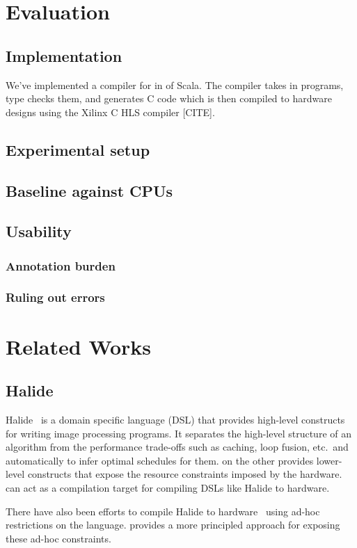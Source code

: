 \documentclass[acmsmall,review,anonymous]{acmart}\settopmatter{printfolios=true,printccs=false,printacmref=false}
\begin{document}
\section{Evaluation}
\subsection{Implementation}
We've implemented a compiler for \sys{} in \sysloc{} of Scala. The compiler
takes in \sys{} programs, type checks them, and generates C code which is then
compiled to hardware designs using the Xilinx C HLS compiler [CITE].
\subsection{Experimental setup}
\subsection{Baseline against CPUs}
\subsection{Usability}
\subsubsection{Annotation burden}
\subsubsection{Ruling out errors}

\section{Related Works}

\subsection{Halide}
Halide~\cite{halide} is a domain specific language (DSL) that provides high-level constructs for writing image processing
programs. It separates the high-level structure of an algorithm from the
performance trade-offs such as caching, loop fusion, etc.\ and automatically to
infer optimal schedules for them. \sys{} on the other provides lower-level constructs
that expose the resource constraints imposed by the hardware. \sys{} can act as a
compilation target for compiling DSLs like Halide to hardware.

There have also been efforts to compile Halide to hardware~\cite{halide-hls} using ad-hoc
restrictions on the language. \sys{} provides a more principled approach for
exposing these ad-hoc constraints.
\end{document}
